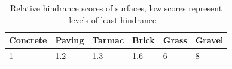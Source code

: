 \begin{table}[hb]
\caption[Relative hindrance scores of surfaces]{Relative hindrance scores of surfaces, low scores represent levels of least hindrance ~\cite{Matthews2003} \label{hindrance}}
\centering
\begin{tabular}{|l|l|l|l|l|l|}
	\hline
	Concrete & Paving & Tarmac & Brick & Grass & Gravel\\
	\hline
	1 & 1.2 & 1.3 & 1.6 & 6 & 8 \\
	\hline
\end{tabular}
\end{table}